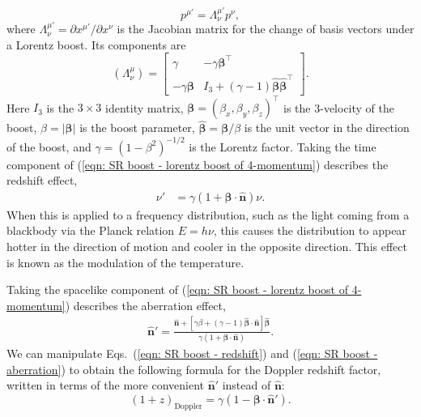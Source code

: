 \documentclass[a4paper,12pt]{report}
\newcommand{\uvec}[1]{\hat{\bm{#1}}}
\begin{document}
\begin{equation} \label{eqn: SR boost - lorentz boost of 4-momentum}
  p^{\mu'} = \Lambda^{\mu'}_\nu p^\nu,
\end{equation}
where $\Lambda^{\mu'}_\nu = \partial x^{\mu'} / \partial x^\nu$ is the Jacobian matrix for the change of basis vectors under a Lorentz boost. Its components are
\begin{equation}\label{eqn: SR boost - lorentz boost matrix}
  (\Lambda^\mu_\nu) = \begin{bmatrix}
    \gamma              & -\gamma\bm{\beta}^\intercal \\
    -\gamma\bm{\beta}   & I_3 + (\gamma - 1)\uvec{\beta}\uvec{\beta}^\intercal
\end{bmatrix}.
\end{equation}
Here $I_3$ is the $3 \times 3$ identity matrix, $\bm{\beta}=(\beta_x,\beta_y,\beta_z)^\intercal$ is the 3-velocity of the boost, $\beta=|\bm{\beta}|$ is the boost parameter, $\uvec{\beta} = \bm{\beta}/\beta$ is the unit vector in the direction of the boost, and $\gamma=(1-\beta^2)^{-1/2}$ is the Lorentz factor. Taking the time component of (\ref{eqn: SR boost - lorentz boost of 4-momentum}) describes the redshift effect,
\begin{align}\label{eqn: SR boost - redshift}
  \nu'&=\gamma(1+\bm{\beta}\cdot\uvec{n})\nu.
\end{align}
When this is applied to a frequency distribution, such as the light coming from a blackbody via the Planck relation $E=h\nu$, this causes the distribution to appear hotter in the direction of motion and cooler in the opposite direction. This effect is known as the modulation of the temperature.

Taking the spacelike component of (\ref{eqn: SR boost - lorentz boost of 4-momentum}) describes the aberration effect,
\begin{align}\label{eqn: SR boost - aberration}
  \hat{\bm{n}}' = \frac{\hat{\bm{n}}+\left[\gamma\beta+(\gamma - 1)\uvec{\beta}\cdot\uvec{n}\right]\uvec{\beta}}{\gamma(1+\bm{\beta}\cdot\uvec{n})}.
\end{align}
We can manipulate Eqs.~(\ref{eqn: SR boost - redshift}) and (\ref{eqn: SR boost - aberration}) to obtain the following formula for the Doppler redshift factor, written in terms of the more convenient $\uvec{n}'$ instead of $\uvec{n}$:
\begin{equation}\label{eqn: SR boost - redshift factor}
  (1+z)_{\text{Doppler}} = \gamma (1-\bm{\beta}\cdot\hat{\bm{n}}').
\end{equation}
\end{document}
